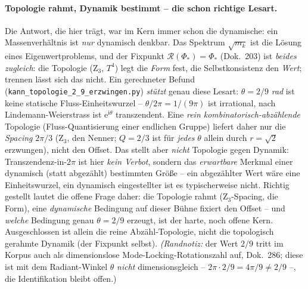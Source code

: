 \paragraph{Topologie rahmt, Dynamik bestimmt -- die schon richtige Lesart.} Die Antwort, die hier
trägt, war im Kern immer schon die dynamische: ein Massenverhältnis ist \emph{nur} dynamisch denkbar.
Das Spektrum $\sqrt{m_k}$ ist die Lösung eines Eigenwertproblems, und der Fixpunkt
$\mathcal R(\Phi_*)=\Phi_*$ (Dok.~203) ist \emph{beides zugleich}: die Topologie (Z$_3$, $T^4$) legt die
\emph{Form} fest, die Selbstkonsistenz den \emph{Wert}; trennen lässt sich das nicht. Ein gerechneter
Befund (\texttt{kann\_topologie\_2\_9\_erzwingen.py}) \emph{stützt} genau diese Lesart: $\theta=2/9$
\emph{rad} ist keine statische Fluss-Einheitswurzel -- $\theta/2\pi=1/(9\pi)$ ist irrational, nach
Lindemann-Weierstrass ist $\mathrm e^{\mathrm i\theta}$ transzendent. Eine \emph{rein
kombinatorisch-abzählende} Topologie (Fluss-Quantisierung einer endlichen Gruppe) liefert daher nur die
\emph{Spacing} $2\pi/3$ (Z$_3$, den Nenner; $Q=2/3$ ist für \emph{jedes} $\theta$ allein durch
$r=\sqrt2$ erzwungen), nicht den Offset. Das stellt aber \emph{nicht} Topologie gegen Dynamik:
Transzendenz-in-$2\pi$ ist hier \emph{kein Verbot}, sondern das \emph{erwartbare} Merkmal einer
dynamisch (statt abgezählt) bestimmten Größe -- ein abgezählter Wert wäre eine Einheitswurzel, ein
dynamisch eingestellter ist es typischerweise nicht. Richtig gestellt lautet die offene Frage daher:
die Topologie rahmt (Z$_3$-Spacing, die Form), eine \emph{dynamische} Bedingung auf dieser Bühne fixiert
den Offset -- und \emph{welche} Bedingung genau $\theta=2/9$ erzeugt, ist der harte, noch offene Kern.
Ausgeschlossen ist allein die reine Abzähl-Topologie, nicht die topologisch gerahmte Dynamik (der
Fixpunkt selbst). \emph{(Randnotiz:} der Wert $2/9$ tritt im Korpus auch als dimensionslose
Mode-Locking-Rotationszahl auf, Dok.~286; diese ist mit dem Radiant-Winkel $\theta$ \emph{nicht}
dimensionsgleich -- $2\pi\cdot2/9=4\pi/9\neq2/9$ --, die Identifikation bleibt offen.)

